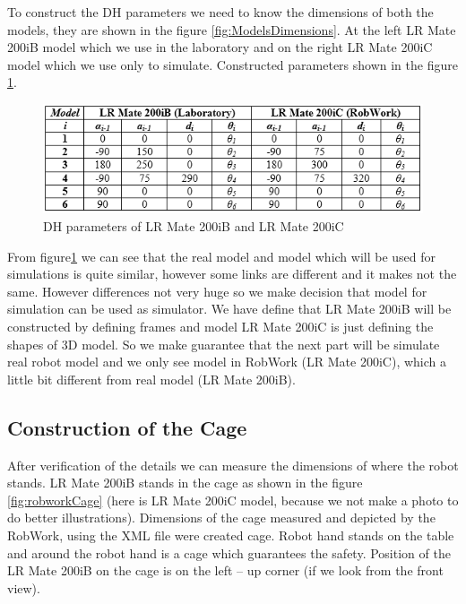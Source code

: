 To construct the DH parameters we need to know the dimensions of both the models, they are shown in the figure \ref{fig:ModelsDimensions}. At the left LR Mate 200iB model which we use in the laboratory and on the right LR Mate 200iC model which we use only to simulate. Constructed parameters shown in the figure \ref{fig:tableParameters}. 

\begin{figure}[H]
  \centering
  \includegraphics[scale= 0.8]{source/table2.png}
  \caption{DH parameters of LR Mate 200iB and LR Mate 200iC}
  \label{fig:tableParameters}
\end{figure}

From figure\ref{fig:tableParameters} we can see that the real model and model which will be used for simulations is quite similar, however some links are different and it makes not the same. However differences not very huge so we make decision that model for simulation can be used as simulator. We have define that LR Mate 200iB will be constructed by defining frames and model LR Mate 200iC is just defining the shapes of 3D model. So we make guarantee that the next part will be simulate real robot model and we only see model in RobWork (LR Mate 200iC), which a little bit different from real model (LR Mate 200iB).

\subsection{Construction of the Cage}
After verification of the details we can measure the dimensions of where the robot stands. LR Mate 200iB stands in the cage as shown in the figure \ref{fig:robworkCage} (here is LR Mate 200iC model, because we not make a photo to do better illustrations). Dimensions of the cage measured and depicted by the RobWork, using the XML file were created cage. Robot hand stands on the table and around the robot hand is a cage which guarantees the safety. Position of the LR Mate 200iB on the cage is on the left – up corner (if we look from the front view).

